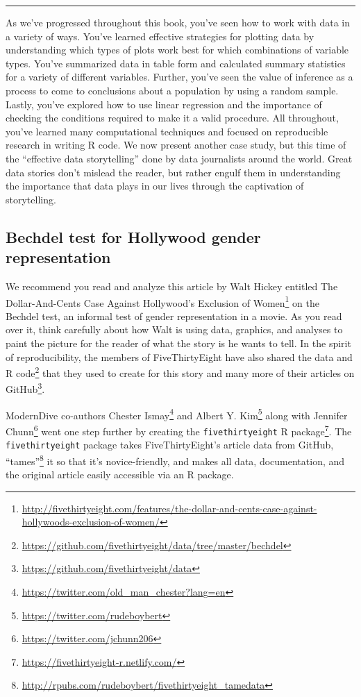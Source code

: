 \documentclass[12pt,]{krantz}
\renewcommand{\href}[2]{#2\footnote{\url{#1}}}
\begin{document}
\begin{center}\rule{0.5\linewidth}{\linethickness}\end{center}

As we've progressed throughout this book, you've seen how to work with
data in a variety of ways. You've learned effective strategies for
plotting data by understanding which types of plots work best for which
combinations of variable types. You've summarized data in table form and
calculated summary statistics for a variety of different variables.
Further, you've seen the value of inference as a process to come to
conclusions about a population by using a random sample. Lastly, you've
explored how to use linear regression and the importance of checking the
conditions required to make it a valid procedure. All throughout, you've
learned many computational techniques and focused on reproducible
research in writing R code. We now present another case study, but this
time of the ``effective data storytelling'' done by data journalists
around the world. Great data stories don't mislead the reader, but
rather engulf them in understanding the importance that data plays in
our lives through the captivation of storytelling.

\subsection{Bechdel test for Hollywood gender
representation}\label{bechdel-test-for-hollywood-gender-representation}

We recommend you read and analyze this article by Walt Hickey entitled
\href{http://fivethirtyeight.com/features/the-dollar-and-cents-case-against-hollywoods-exclusion-of-women/}{The
Dollar-And-Cents Case Against Hollywood's Exclusion of Women} on the
Bechdel test, an informal test of gender representation in a movie. As
you read over it, think carefully about how Walt is using data,
graphics, and analyses to paint the picture for the reader of what the
story is he wants to tell. In the spirit of reproducibility, the members
of FiveThirtyEight have also shared the
\href{https://github.com/fivethirtyeight/data/tree/master/bechdel}{data
and R code} that they used to create for this story and many more of
their articles on
\href{https://github.com/fivethirtyeight/data}{GitHub}.

ModernDive co-authors
\href{https://twitter.com/old_man_chester?lang=en}{Chester Ismay} and
\href{https://twitter.com/rudeboybert}{Albert Y. Kim} along with
\href{https://twitter.com/jchunn206}{Jennifer Chunn} went one step
further by creating the
\href{https://fivethirtyeight-r.netlify.com/}{\texttt{fivethirtyeight} R
package}. The \texttt{fivethirtyeight} package takes FiveThirtyEight's
article data from GitHub,
\href{http://rpubs.com/rudeboybert/fivethirtyeight_tamedata}{``tames''}
it so that it's novice-friendly, and makes all data, documentation, and
the original article easily accessible via an R package.
\end{document}
